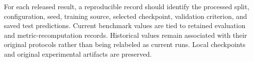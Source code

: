 \documentclass[10pt,twocolumn,letterpaper]{article}
\begin{document}
For each released result, a reproducible record should identify the
processed split, configuration, seed, training source, selected checkpoint,
validation criterion, and saved test predictions. Current benchmark
values are tied to retained evaluation and metric-recomputation records.
Historical values remain associated with their original protocols rather
than being relabeled as current runs. Local checkpoints and original
experimental artifacts are preserved.
\end{document}
